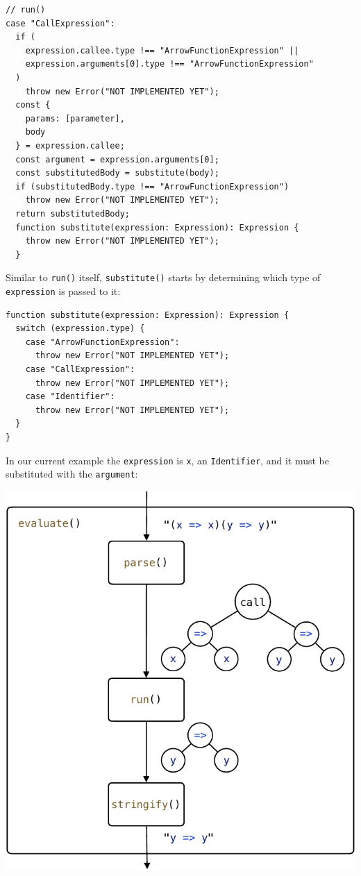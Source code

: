 \documentclass[12pt, oneside]{book}
\begin{document}
\begin{verbatim}
// run()
case "CallExpression":
  if (
    expression.callee.type !== "ArrowFunctionExpression" ||
    expression.arguments[0].type !== "ArrowFunctionExpression"
  )
    throw new Error("NOT IMPLEMENTED YET");
  const {
    params: [parameter],
    body
  } = expression.callee;
  const argument = expression.arguments[0];
  const substitutedBody = substitute(body);
  if (substitutedBody.type !== "ArrowFunctionExpression")
    throw new Error("NOT IMPLEMENTED YET");
  return substitutedBody;
  function substitute(expression: Expression): Expression {
    throw new Error("NOT IMPLEMENTED YET");
  }
\end{verbatim}

Similar to \texttt{run()} itself, \texttt{substitute()} starts by determining which type of \texttt{expression} is passed to it:

\begin{verbatim}
function substitute(expression: Expression): Expression {
  switch (expression.type) {
    case "ArrowFunctionExpression":
      throw new Error("NOT IMPLEMENTED YET");
    case "CallExpression":
      throw new Error("NOT IMPLEMENTED YET");
    case "Identifier":
      throw new Error("NOT IMPLEMENTED YET");
  }
}
\end{verbatim}

In our current example the \texttt{expression} is \texttt{x}, an \texttt{Identifier}, and it must be substituted with the \texttt{argument}:

\begin{center}
\includegraphics[page = 5]{images.pdf}
\end{center}
\end{document}

